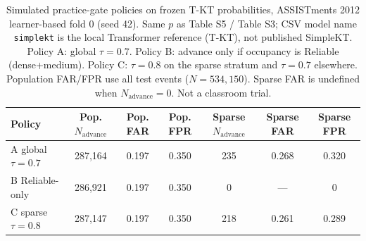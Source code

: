 \begin{table}[htbp]
\caption{Simulated practice-gate policies on frozen T-KT probabilities, ASSISTments 2012 learner-based fold 0 (seed 42). Same $p$ as Table S5 / Table S3; CSV model name \texttt{simplekt} is the local Transformer reference (T-KT), not published SimpleKT. Policy A: global $\tau=0.7$. Policy B: advance only if occupancy is Reliable (dense+medium). Policy C: $\tau=0.8$ on the sparse stratum and $\tau=0.7$ elsewhere. Population FAR/FPR use all test events ($N=534{,}150$). Sparse FAR is undefined when $N_{\mathrm{advance}}=0$. Not a classroom trial.}
\label{tab:s4_occupancy_policies}
\centering
\small
\begin{tabular}{lcccccc}
\toprule
Policy & Pop. $N_{\mathrm{advance}}$ & Pop. FAR & Pop. FPR & Sparse $N_{\mathrm{advance}}$ & Sparse FAR & Sparse FPR \\
\midrule
A global $\tau=0.7$ & 287{,}164 & 0.197 & 0.350 & 235 & 0.268 & 0.320 \\
B Reliable-only & 286{,}921 & 0.197 & 0.350 & 0 & --- & 0 \\
C sparse $\tau=0.8$ & 287{,}147 & 0.197 & 0.350 & 218 & 0.261 & 0.289 \\
\bottomrule
\end{tabular}
\end{table}
